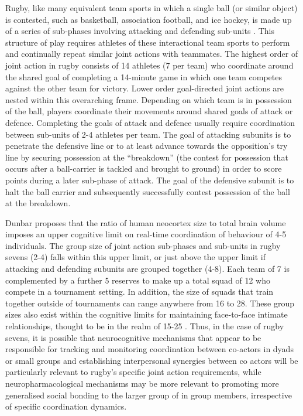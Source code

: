 Rugby, like many equivalent team sports in which a single ball (or similar object) is contested, such as basketball, association football, and ice hockey, is made up of a series of sub-phases involving attacking and defending sub-units \citep{Passos2011}. This structure of play requires athletes of these interactional team sports to perform and continually repeat similar joint actions with teammates.   The highest order of joint action in rugby consists of 14 athletes (7 per team) who coordinate around the shared goal of completing a 14-minute game in which one team competes against the other team for victory. Lower order goal-directed joint actions are nested within this overarching frame.  Depending on which team is in possession of the ball, players coordinate their movements around shared goals of attack or defence.  Completing the goals of attack and defence usually require coordination between sub-units of 2-4 athletes per team.  The goal of attacking subunits is to penetrate the defensive line or to at least advance towards the opposition's try line by securing possession at the ``breakdown'' (the contest for possession that occurs after a ball-carrier is tackled and brought to ground) in order to score points during a later sub-phase of attack.  The goal of the defensive subunit is to halt the ball carrier and subsequently successfully contest possession of the ball at the breakdown.

Dunbar \textcite{Dunbar1992} proposes that the ratio of human neocortex size to total brain volume imposes an upper cognitive limit on real-time coordination of behaviour of 4-5 individuals.  The group size of joint action sub-phases and sub-units in rugby sevens (2-4) falls within this upper limit, or just above the upper limit if attacking and defending subunits are grouped together (4-8). Each team of 7 is complemented by a further 5 reserves to make up a total squad of 12 who compete in a tournament setting.  In addition, the size of squads that train together outside of tournaments can range anywhere from 16 to 28.  These group sizes also exist within the cognitive limits for maintaining face-to-face intimate relationships, thought to be in the realm of 15-25 \citep{Dunbar1992,Dunbar2010}. Thus, in the case of rugby sevens, it is possible that neurocognitive mechanisms that appear to be responsible for tracking and monitoring coordination between co-actors in dyads or small groups and establishing interpersonal synergies between co actors will be particularly relevant
to rugby's specific joint action requirements, while neuropharmacological mechanisms may be more relevant to promoting more generalised social bonding to the larger group of in group members, irrespective of specific coordination dynamics.

